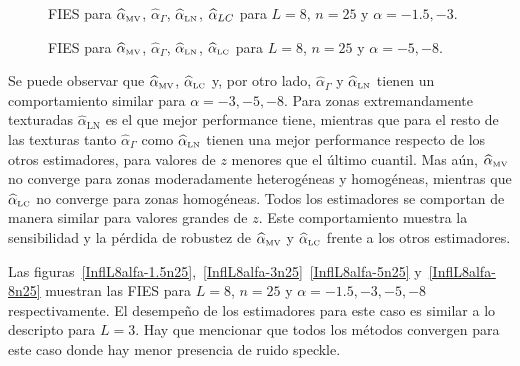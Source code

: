 \begin{figure}[htb]
	\caption{\label{InflL8n25:-1.5y-3}\small FIES para $\widehat{\alpha}_{\text{\tiny{MV}}}$, $\widehat{\alpha}_{\Gamma}$, $\widehat{\alpha}_{\text{\tiny{LN}}}$, $\widehat{\alpha}_{\text\tiny{{LC}}}$ para $L=8$, $n=25$ y $\alpha=-1.5,-3$.}
\end{figure}

\begin{figure}[htb]
	\caption{\label{InflL8n25:-5y-8}\small FIES para $\widehat{\alpha}_{\text{\tiny{MV}}}$, $\widehat{\alpha}_{\Gamma}$, $\widehat{\alpha}_{\text{\tiny{LN}}}$, $\widehat{\alpha}_{\text{\tiny{LC}}}$ para $L=8$, $n=25$ y $\alpha=-5,-8$.}
\end{figure}

Se puede observar que $\widehat{\alpha}_{\text{\tiny{MV}}}$, $\widehat{\alpha}_{\text{\tiny{LC}}}$ y, por otro lado, $\widehat{\alpha}_{\Gamma}$ y $\widehat{\alpha}_{\text{\tiny{LN}}}$ tienen un comportamiento similar para $\alpha=-3, -5, -8$. Para zonas extremandamente texturadas $\widehat{\alpha}_{\text{LN}}$ es el que mejor performance tiene, mientras que para el resto de las texturas tanto $\widehat{\alpha}_{\Gamma}$ como $\widehat{\alpha}_{\text{\tiny{LN}}}$ tienen una mejor performance respecto de los otros estimadores, para valores de $z$ menores que el último cuantil. Mas aún, $\widehat{\alpha}_{\text{\tiny{MV}}}$ no converge para zonas moderadamente heterogéneas y homogéneas, mientras que $\widehat{\alpha}_{\text{\tiny{LC}}}$ no converge para zonas homogéneas. Todos los estimadores se comportan de manera similar para valores grandes de $z$. Este comportamiento muestra la sensibilidad y la pérdida de robustez de $\widehat{\alpha}_{\text{\tiny{MV}}}$ y $\widehat{\alpha}_{\text{\tiny{LC}}}$ frente a los otros estimadores. 

Las figuras~\ref{InflL8alfa-1.5n25},~\ref{InflL8alfa-3n25}~\ref{InflL8alfa-5n25} y~\ref{InflL8alfa-8n25} muestran las FIES para $L=8$, $n=25$ y $\alpha=-1.5, -3, -5, -8$ respectivamente. El desempeño de los estimadores para este caso es similar a lo descripto para $L=3$. Hay que mencionar que todos los métodos convergen para este caso donde hay menor presencia de ruido speckle. 


